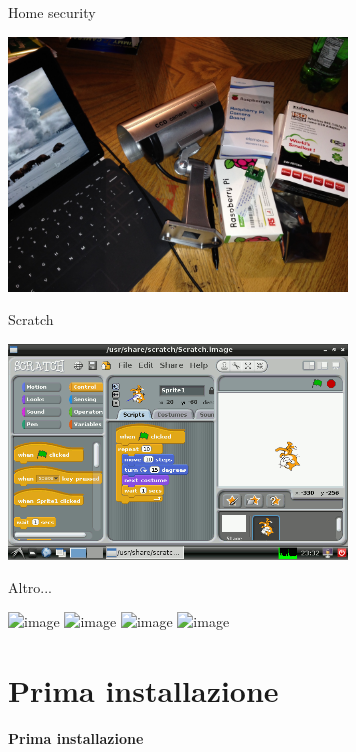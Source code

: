 \documentclass[xcolor=svgnames,11pt]{beamer}
\begin{document}
\begin{frame}{Home security}
\begin{center}
\includegraphics[width=9cm]{uc/security.jpg}
\end{center}
\end{frame}

\begin{frame}{Scratch}
\begin{center}
\includegraphics[width=9cm]{uc/scratch.png}
\end{center}
\end{frame}

\begin{frame}{Altro...}
\begin{center}
\includegraphics<1>[width=9cm]{uc/cluster.jpg}
\includegraphics<2>[width=9cm]{uc/arcade.jpg}
\includegraphics<3>[width=9cm]{uc/keyboard.jpg}
\includegraphics<4>[width=9cm]{uc/drone.jpg}

\end{center}
\end{frame}

\section{Prima installazione}

\begin{frame}{}
\begin{center}
\begin{Huge}
{\color{green_raspi} \textbf{Prima installazione}}
\end{Huge}
\end{center}
\end{frame}
\end{document}

